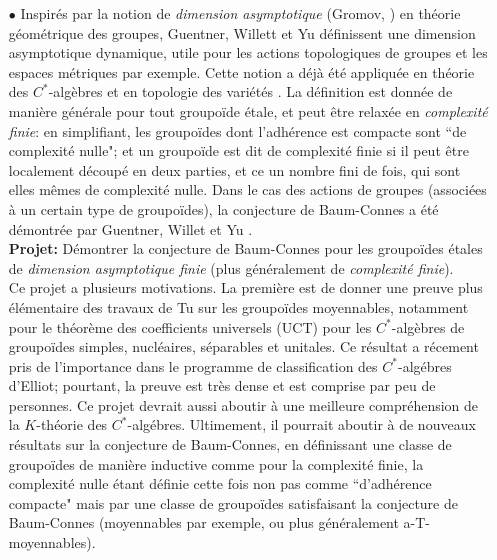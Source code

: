 \documentclass[a4paper,11pt]{article}
\begin{document}
\begin{itemize} 
\item[$\bullet$] Inspir\'es par la notion de \textit{dimension asymptotique} (Gromov, \cite{gromov1993asymptotic}) en th\'eorie g\'eom\'etrique des groupes, Guentner,  Willett et Yu d\'efinissent \cite{Guentner:2014aa} une dimension asymptotique dynamique, utile pour les actions topologiques de groupes et les espaces m\'etriques par exemple. Cette notion a d\'ej\`a \'et\'e appliqu\'ee en th\'eorie des $C^*$-alg\`ebres \cite{deeley2018nuclear} et en topologie des vari\'et\'es \cite{bartels2019farrell}. La d\'efinition est donn\'ee de mani\`ere g\'en\'erale pour tout groupo\"ide \'etale, et peut \^etre relax\'ee en \textit{complexit\'e finie}: en simplifiant, les groupo\"ides dont l'adh\'erence est compacte sont ``de complexit\'e nulle"; et un groupo\"ide est dit de complexit\'e finie si il peut \^etre localement d\'ecoup\'e en deux parties, et ce un nombre fini de fois, qui sont elles m\^emes de complexit\'e nulle. Dans le cas des actions de groupes (associ\'ees \`a un certain type de groupo\"ides), la conjecture de Baum-Connes a \'et\'e d\'emontr\'ee par Guentner, Willet et Yu \cite{GWY2}.\\

\textbf{Projet:} D\'emontrer la conjecture de Baum-Connes pour les groupo\"ides \'etales de \textit{dimension asymptotique finie} (plus g\'en\'eralement de \textit{complexit\'e finie}).\\

Ce projet a plusieurs motivations. La premi\`ere est de donner une preuve plus \'el\'ementaire des travaux de Tu \cite{TuThese} sur les groupo\"ides moyennables, notamment pour le th\'eor\`eme des coefficients universels (UCT) pour les $C^*$-alg\`ebres de groupo\"ides simples, nucl\'eaires, s\'eparables et unitales. Ce r\'esultat a r\'ecement pris de l'importance dans le programme de classification des $C^*$-alg\'ebres d'Elliot; pourtant, la preuve est tr\`es dense et est comprise par peu de personnes. Ce projet devrait aussi aboutir \`a une meilleure compr\'ehension de la $K$-th\'eorie des $C^*$-alg\'ebres. Ultimement, il pourrait aboutir \`a de nouveaux r\'esultats sur la conjecture de Baum-Connes, en d\'efinissant une classe de groupo\"ides de mani\`ere inductive comme pour la complexit\'e finie, la complexit\'e nulle \'etant d\'efinie cette fois non pas comme ``d'adh\'erence compacte" mais par une classe de groupo\"ides satisfaisant la conjecture de Baum-Connes (moyennables par exemple, ou plus g\'en\'eralement a-T-moyennables).\\


\end{itemize}
\end{document}

